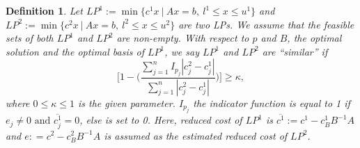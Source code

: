 \documentclass{article}
\newtheorem{definition}[theorem]{Definition}
\newtheorem{proposition}[theorem]{Proposition}
\begin{document}
\begin{multicols}{3}
\noindent
\begin{center}  
\begin{definition}
     Let $LP^1 := \min \{  {c^1}x ~|~ Ax = b, ~l^1 \leq x \leq u^1 %
     \}$ and $LP^2 := \min\{  {c^2}x  ~|~  Ax = b,~ l^2 \leq x \leq u^2 %
     \}$ are two LPs.  
     We assume that the feasible sets of both $LP^1$ and $LP^2$ are non-empty.
     With respect to $p$ and $B$, the optimal solution and the optimal basis of $LP^1$, we say $LP^1$ and $LP^2$ are ``similar'' if  
             $$\Big[ 1 -  \big( \frac{\sum_{j=1}^n I_{p_{j}}|c^2_j - c^1_j|}{\sum_{j=1}^n |c^2_j - c^1_j|}\big) \Big] \geq \kappa,$$ where $0 \leq \kappa \leq 1$ is the given parameter. $I_{p_{j}}$ the indicator function is equal to 1 if $e_j \neq 0 \text{~and~} \overline{c^1_j} = 0$, else is set to 0. Here, reduced cost of $LP^1$ is $\overline{c^1} := c^1 - c^1_B B^{-1}A$ and $e: =  c^2 - c^2_B B^{-1}A$ is assumed as the estimated reduced cost of $LP^2$.
\end{definition}
\end{center}

\begin{center}
\large
{}
\end{center}


\end{multicols}
\end{document}
